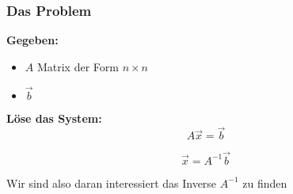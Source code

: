     \begin{frame}
        \frametitle{Das Problem}

        \textbf{Gegeben:}
        \begin{itemize}
            \item $A$ Matrix der Form $n \times n$
            \item $\vec{b}$
       \end{itemize}

       \hfill

       \textbf{Löse das System:}
        $$A \vec{x} = \vec{b}$$

        $$\vec{x} = A^{-1} \vec{b}$$

       \hfill

        Wir sind also daran interessiert das Inverse $A^{-1}$ zu finden

    \end{frame}


        
